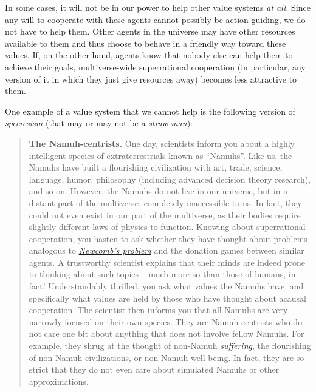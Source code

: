 In some cases, it will not be in our power to help other value systems
\emph{at all}. Since any will to cooperate with these agents cannot
possibly be action-guiding, we do not have to help them. Other agents in
the universe may have other resources available to them and thus choose
to behave in a friendly way toward these values. If, on the other hand,
agents know that nobody else can help them to achieve their goals,
multiverse-wide superrational cooperation (in particular, any version of
it in which they just give resources away) becomes less attractive to
them.

One example of a value system that we cannot help is the following
version of
\href{https://en.wikipedia.org/wiki/Speciesism}{\emph{speciesism}} (that
may or may not be a
\href{https://en.wikipedia.org/wiki/Straw_man}{\emph{straw man}}):

\begin{quote}
\textbf{The Namuh-centrists.} One day, scientists inform you about a
highly intelligent species of extraterrestrials known as ``Namuhs''.
Like us, the Namuhs have built a flourishing civilization with art,
trade, science, language, humor, philosophy (including advanced decision
theory research), and so on. However, the Namuhs do not live in our
universe, but in a distant part of the multiverse, completely
inaccessible to us. In fact, they could not even exist in our part of
the multiverse, as their bodies require slightly different laws of
physics to function. Knowing about superrational cooperation, you hasten
to ask whether they have thought about problems analogous to
\href{https://en.wikipedia.org/wiki/Newcomb\%27s_paradox}{\emph{Newcomb's
problem}} and the donation games between similar agents. A trustworthy
scientist explains that their minds are indeed prone to thinking about
such topics -- much more so than those of humans, in fact!
Understandably thrilled, you ask what values the Namuhs have, and
specifically what values are held by those who have thought about
acausal cooperation. The scientist then informs you that all Namuhs are
very narrowly focused on their own species. They are Namuh-centrists who
do not care one bit about anything that does not involve fellow Namuhs.
For example, they shrug at the thought of non-Namuh
\href{https://foundational-research.org/the-case-for-suffering-focused-ethics/}{\emph{suffering}},
the flourishing of non-Namuh civilizations, or non-Namuh well-being. In
fact, they are so strict that they do not even care about simulated
Namuhs or other approximations.
\end{quote}

